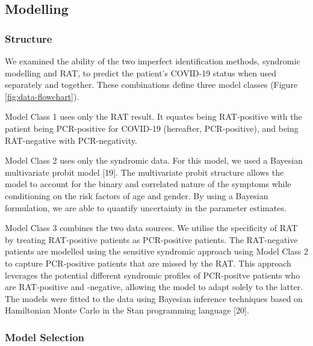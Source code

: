 \documentclass[]{elsarticle} %
\begin{document}
\hypertarget{modelling}{%
\subsection{Modelling}\label{modelling}}

\hypertarget{structure}{%
\subsubsection{Structure}\label{structure}}

We examined the ability of the two imperfect identification methods, syndromic modelling and RAT, to predict the patient's COVID-19 status when used separately and together.
These combinations define three model classes (Figure \ref{fig:data-flowchart}).

Model Class 1 uses only the RAT result.
It equates being RAT-positive with the patient being PCR-positive for COVID-19 (hereafter, PCR-positive), and being RAT-negative with PCR-negativity.

Model Class 2 uses only the syndromic data.
For this model, we used a Bayesian multivariate probit model {[}19{]}.
The multivariate probit structure allows the model to account for the binary and correlated nature of the symptoms while conditioning on the risk factors of age and gender.
By using a Bayesian formulation, we are able to quantify uncertainty in the parameter estimates.

Model Class 3 combines the two data sources.
We utilise the specificity of RAT by treating RAT-positive patients as PCR-positive patients.
The RAT-negative patients are modelled using the sensitive syndromic approach using Model Class 2 to capture PCR-positive patients that are missed by the RAT.
This approach leverages the potential different syndromic profiles of PCR-positve patients who are RAT-positive and -negative, allowing the model to adapt solely to the latter.
The models were fitted to the data using Bayesian inference techniques based on Hamiltonian Monte Carlo in the Stan programming language {[}20{]}.

\hypertarget{model-selection}{%
\subsubsection{Model Selection}\label{model-selection}}
\end{document}
